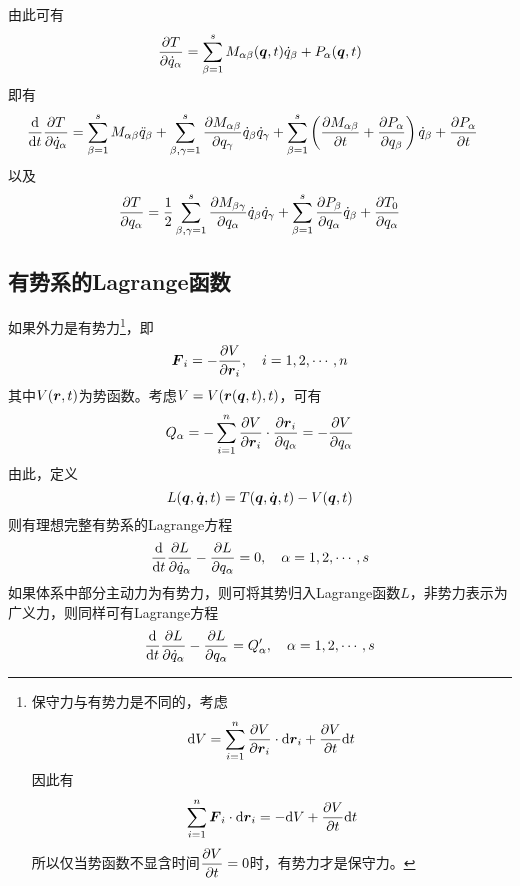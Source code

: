 由此可有
\begin{equation*}
	\frac{\partial T}{\partial \dot{q}_\alpha} = \sum_{\beta=1}^s M_{\alpha\beta}(\boldsymbol{q},t) \dot{q}_\beta + P_\alpha(\boldsymbol{q},t)
\end{equation*}
即有
\begin{align*}
	\frac{\mathrm{d}}{\mathrm{d} t} \frac{\partial T}{\partial \dot{q}_\alpha} & = \sum_{\beta=1}^s M_{\alpha\beta} \ddot{q}_\beta + \sum_{\beta,\gamma=1}^s \frac{\partial M_{\alpha\beta}}{\partial q_\gamma} \dot{q}_\beta \dot{q}_\gamma + \sum_{\beta=1}^s \left(\frac{\partial M_{\alpha\beta}}{\partial t} + \frac{\partial P_\alpha}{\partial q_\beta}\right) \dot{q}_\beta + \frac{\partial P_\alpha}{\partial t}
\end{align*}
以及
\begin{align*}
	\frac{\partial T}{\partial q_\alpha} = \frac12 \sum_{\beta,\gamma=1}^s \frac{\partial M_{\beta\gamma}}{\partial q_\alpha} \dot{q}_\beta \dot{q}_\gamma + \sum_{\beta=1}^s \frac{\partial P_\beta}{\partial q_\alpha} \dot{q}_\beta + \frac{\partial T_0}{\partial q_\alpha}
\end{align*}

\subsection{有势系的Lagrange函数}

如果外力是有势力\footnote{保守力与有势力是不同的，考虑
\begin{equation*}
	\mathrm{d} V = \sum_{i=1}^n \frac{\partial V}{\partial \boldsymbol{r}_i} \cdot \mathrm{d} \boldsymbol{r}_i + \frac{\partial V}{\partial t}\mathrm{d} t
\end{equation*}
因此有
\begin{equation*}
	\sum_{i=1}^n \boldsymbol{F}_i \cdot \mathrm{d} \boldsymbol{r}_i = -\mathrm{d} V + \frac{\partial V}{\partial t}\mathrm{d} t
\end{equation*}
所以仅当势函数不显含时间$\dfrac{\partial V}{\partial t}=0$时，有势力才是保守力。}，即
\begin{equation*}
	\boldsymbol{F}_i = -\frac{\partial V}{\partial \boldsymbol{r}_i},\quad i = 1,2,\cdots,n
\end{equation*}
其中$V(\boldsymbol{r},t)$为势函数。考虑$V = V(\boldsymbol{r}(\boldsymbol{q},t),t)$，可有
\begin{equation*}
	Q_\alpha = -\sum_{i=1}^n \frac{\partial V}{\partial \boldsymbol{r}_i} \cdot \frac{\partial \boldsymbol{r}_i}{\partial q_\alpha} = -\frac{\partial V}{\partial q_\alpha}
\end{equation*}
由此，定义
\begin{equation}
	L(\boldsymbol{q},\dot{\boldsymbol{q}},t) = T(\boldsymbol{q},\dot{\boldsymbol{q}},t) - V(\boldsymbol{q},t)
	\label{Lagrange函数}
\end{equation}
则有{\heiti 理想完整有势系的Lagrange方程}
\begin{equation}
	\frac{\mathrm{d}}{\mathrm{d} t} \frac{\partial L}{\partial \dot{q}_\alpha} - \frac{\partial L}{\partial q_\alpha} = 0,\quad \alpha =1,2,\cdots,s
	\label{理想完整有势系的Lagrange方程}
\end{equation}
如果体系中部分主动力为有势力，则可将其势归入Lagrange函数$L$，非势力表示为广义力，则同样可有Lagrange方程
\begin{equation}
	\frac{\mathrm{d}}{\mathrm{d} t} \frac{\partial L}{\partial \dot{q}_\alpha} - \frac{\partial L}{\partial q_\alpha} = Q'_\alpha,\quad \alpha =1,2,\cdots,s
\end{equation}

